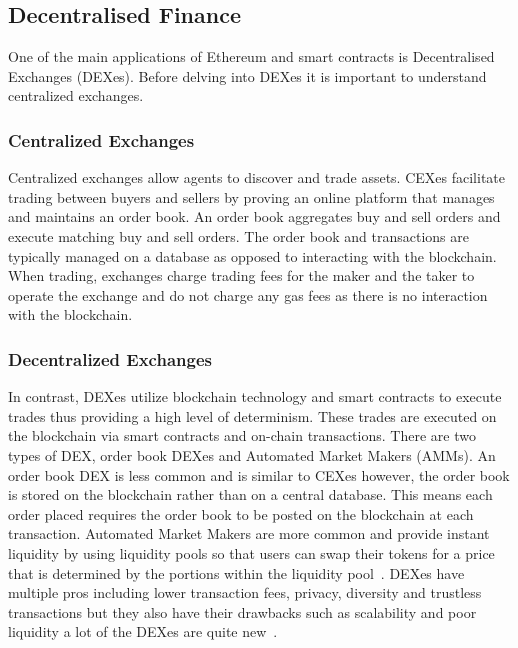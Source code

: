 \subsection{Decentralised Finance}
One of the main applications of Ethereum and smart contracts is Decentralised Exchanges (DEXes). Before delving into DEXes it is important to understand centralized exchanges.

\subsubsection{Centralized Exchanges}
Centralized exchanges allow agents to discover and trade assets. CEXes facilitate trading between buyers and sellers by proving an online platform that manages and maintains an order book. An order book aggregates buy and sell orders and execute matching buy and sell orders. The order book and transactions are typically managed on a database as opposed to interacting with the blockchain. When trading, exchanges charge trading fees for the maker and the taker to operate the exchange and do not charge any gas fees as there is no interaction with the blockchain. 

\subsubsection{Decentralized Exchanges}
In contrast, DEXes utilize blockchain technology and smart contracts to execute trades thus providing a high level of determinism. These trades are executed on the blockchain via smart contracts and on-chain transactions. There are two types of DEX, order book DEXes and Automated Market Makers (AMMs). An order book DEX is less common and is similar to CEXes however, the order book is stored on the blockchain rather than on a central database. This means each order placed requires the order book to be posted on the blockchain at each transaction. Automated Market Makers are more common and provide instant liquidity by using liquidity pools so that users can swap their tokens for a price that is determined by the portions within the liquidity pool~\cite{DEXes}. DEXes have multiple pros including lower transaction fees, privacy, diversity and trustless transactions but they also have their drawbacks such as scalability and poor liquidity a lot of the DEXes are quite new~\cite{DEXvsCEX}.

